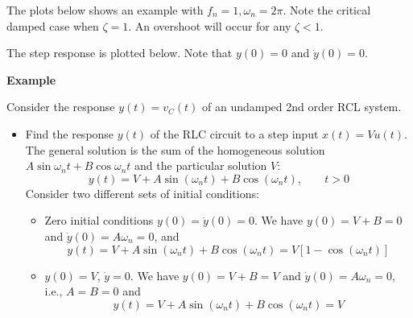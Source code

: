 \documentclass{article}
\begin{document}
The plots below shows an example with $f_n=1, \omega_n=2\pi$. Note the critical 
damped case when $\zeta=1$. An overshoot will occur for any $\zeta<1$.

The step response is plotted below. Note that $y(0)=0$ and $\dot{y}(0)=0$.




{\bf Example} 

Consider the response $y(t)=v_C(t)$ of an undamped 2nd order RCL system.

\begin{itemize}
\item Find the response $y(t)$ of the RLC circuit to a step input $x(t)=Vu(t)$.
  The general solution is the sum of the homogeneous solution 
  $A\sin\omega_nt+B\cos\omega_nt$ and the particular solution $V$:
  \begin{equation}
    y(t)=V+A\sin(\omega_nt)+B\cos(\omega_nt),\;\;\;\;\;\;\;t>0 
  \end{equation}
  Consider two different sets of initial conditions:
  \begin{itemize}
  \item Zero initial conditions $y(0)=\dot{y}(0)=0$. We have $y(0)=V+B=0$ 
    and $\dot{y}(0)=A\omega_n=0$, and
    \begin{equation}
      y(t)=V+A\sin(\omega_nt)+B\cos(\omega_nt)=V[1-\cos(\omega_nt)] 
    \end{equation}
  \item $y(0)=V$, $\dot{y}=0$. We have $y(0)=V+B=V$ and $\dot{y}(0)=A\omega_n=0$, 
    i.e., $A=B=0$ and
    \begin{equation}
      y(t)=V+A\sin(\omega_nt)+B\cos(\omega_nt)=V 
    \end{equation}
  \end{itemize}
  


\end{itemize}
\end{document}

